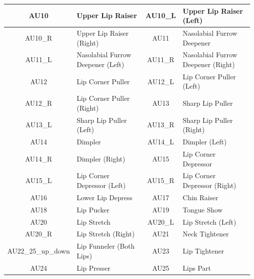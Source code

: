 \documentclass[../../main.tex]{subfiles}
\begin{document}
\begin{table}[h]
\begin{tabular}{|c|l|c|l|}
        AU10             & Upper Lip Raiser                        & AU10\_L           & Upper Lip Raiser (Left)                   \\ \hline
        AU10\_R          & Upper Lip Raiser (Right)                & AU11             & Nasolabial Furrow Deepener                \\ \hline
        AU11\_L          & Nasolabial Furrow Deepener (Left)       & AU11\_R           & Nasolabial Furrow Deepener (Right)        \\ \hline
        AU12             & Lip Corner Puller                       & AU12\_L           & Lip Corner Puller (Left)                  \\ \hline
        AU12\_R          & Lip Corner Puller (Right)               & AU13             & Sharp Lip Puller                          \\ \hline
        AU13\_L          & Sharp Lip Puller (Left)                 & AU13\_R           & Sharp Lip Puller (Right)                  \\ \hline
        AU14             & Dimpler                                 & AU14\_L           & Dimpler (Left)                            \\ \hline
        AU14\_R          & Dimpler (Right)                         & AU15             & Lip Corner Depressor                      \\ \hline
        AU15\_L          & Lip Corner Depressor (Left)             & AU15\_R           & Lip Corner Depressor (Right)              \\ \hline
        AU16             & Lower Lip Depress                       & AU17             & Chin Raiser                               \\ \hline
        AU18             & Lip Pucker                              & AU19             & Tongue Show                               \\ \hline
        AU20             & Lip Stretch                             & AU20\_L           & Lip Stretch (Left)                        \\ \hline
        AU20\_R          & Lip Stretch (Right)                     & AU21             & Neck Tightener                            \\ \hline
        AU22\_25\_up\_down & Lip Funneler (Both Lips) & AU23             & Lip Tightener                             \\ \hline
        AU24             & Lip Presser                             & AU25             & Lips Part                                 \\ \hline

\end{tabular}
\end{table}
\end{document}
